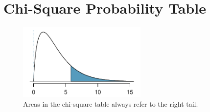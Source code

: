 \section{Chi-Square Probability Table}
\label{chiSquareProbabilityTable}

\begin{figure}[hhh]
\centering
\includegraphics[height=1.5in]{extraTeX/appendix/figures/chiSquareTail/chiSquareTail}
\caption{Areas in the chi-square table always refer to the right tail.}
\end{figure}


